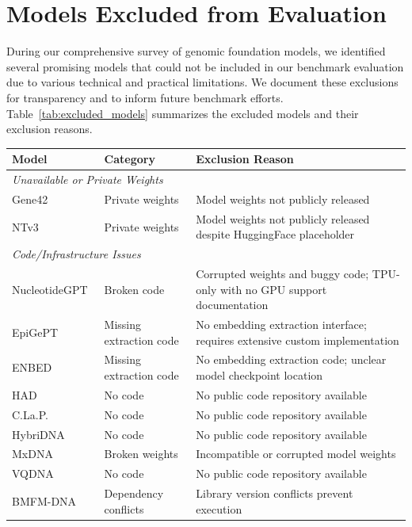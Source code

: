 \documentclass{llmxive}
\begin{document}
\section{Models Excluded from Evaluation}
\label{app:excluded_models}

During our comprehensive survey of genomic foundation models, we identified several promising models that could not be included in our benchmark evaluation due to various technical and practical limitations. We document these exclusions for transparency and to inform future benchmark efforts. Table~\ref{tab:excluded_models} summarizes the excluded models and their exclusion reasons.

\begin{table}[h]
\centering
\small
\begin{tabular}{llp{7cm}}
\toprule
\textbf{Model} & \textbf{Category} & \textbf{Exclusion Reason} \\
\midrule
\multicolumn{3}{l}{\textit{Unavailable or Private Weights}} \\
Gene42~\cite{gene42} & Private weights & Model weights not publicly released \\
NTv3~\cite{ntv3} & Private weights & Model weights not publicly released despite HuggingFace placeholder \\
\midrule
\multicolumn{3}{l}{\textit{Code/Infrastructure Issues}} \\
NucleotideGPT~\cite{nucleotidegpt} & Broken code & Corrupted weights and buggy code; TPU-only with no GPU support documentation \\
EpiGePT~\cite{epigept} & Missing extraction code & No embedding extraction interface; requires extensive custom implementation \\
ENBED~\cite{enbed} & Missing extraction code & No embedding extraction code; unclear model checkpoint location \\
HAD~\cite{had} & No code & No public code repository available \\
C.La.P.~\cite{clap} & No code & No public code repository available \\
HybriDNA~\cite{hybridna} & No code & No public code repository available \\
MxDNA~\cite{mxdna} & Broken weights & Incompatible or corrupted model weights \\
VQDNA~\cite{vqdna}  & No code & No public code repository available \\
BMFM-DNA~\cite{bmfmdna} & Dependency conflicts & Library version conflicts prevent execution \\

\end{tabular}
\end{table}
\end{document}
